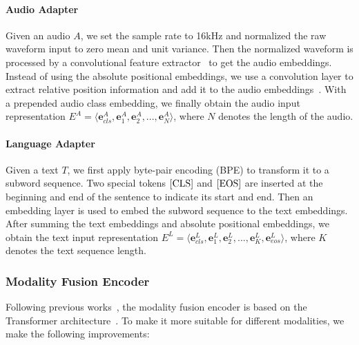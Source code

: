 \paragraph{Audio Adapter}
Given an audio $A$, we set the sample rate to 16kHz and normalized the raw waveform input to zero mean and unit variance. Then the normalized waveform is processed by a convolutional feature extractor~\cite{wav2vec2} to get the audio embeddings. Instead of using the absolute positional embeddings, we use a convolution layer to extract relative position information and add it to the audio embeddings~\cite{Mohamed2019TransformersWC}. With a prepended audio class embedding, we finally obtain the audio input representation $E^A=\langle \bm{e}^A_{cls}, \bm{e}^A_{1}, \bm{e}^A_{2}, ..., \bm{e}^A_{N} \rangle$, where $N$ denotes the length of the audio.
 
\paragraph{Language Adapter}
Given a text $T$, we first apply byte-pair encoding (BPE) \cite{bpe} to transform it to a subword sequence. Two special tokens $\left[{\rm CLS}\right]$ and $\left[{\rm EOS}\right]$ are inserted at the beginning and end of the sentence to indicate its start and end. Then an embedding layer is used to embed the subword sequence to the text embeddings. After summing the text embeddings and absolute positional embeddings, we obtain the text input representation $E^L=\langle \bm{e}^L_{cls}, \bm{e}^L_{1}, \bm{e}^L_{2}, ..., \bm{e}^L_{K}, \bm{e}^L_{eos} \rangle$, where $K$ denotes the text sequence length.

\subsubsection{Modality Fusion Encoder}
Following previous works~\cite{simvlm,ofa,coca,beit3}, the modality fusion encoder is based on the Transformer architecture~\cite{transformer}. 
To make it more suitable for different modalities, we make the following improvements:

